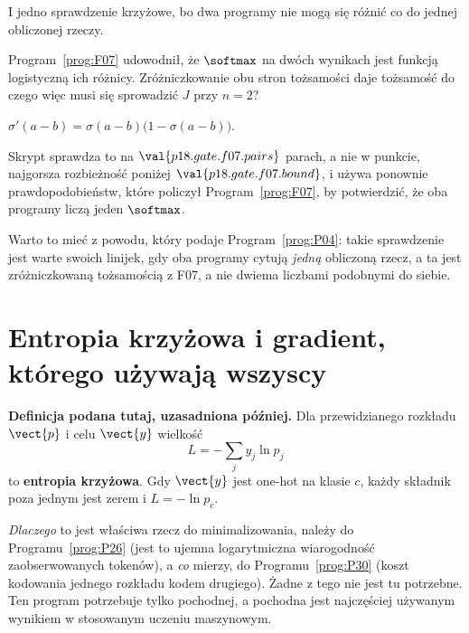 \begin{fr}
I jedno sprawdzenie krzyżowe, bo dwa programy nie mogą się różnić co do
jednej obliczonej rzeczy.

Program~\ref{prog:F07} udowodnił, że $\softmax$ na dwóch wynikach jest
funkcją logistyczną ich różnicy. Zróżniczkowanie obu stron tożsamości daje
tożsamość \dash{} do czego więc musi się sprowadzić $J$ przy $n = 2$?
\nextframe
\end{fr}

\begin{fr}
\begin{ansblock}
$\sigma'(a - b) = \sigma(a-b)\bigl(1 - \sigma(a-b)\bigr)$.
\end{ansblock}

Skrypt sprawdza to na $\val{p18.gate.f07.pairs}$ parach, a nie w punkcie,
najgorsza rozbieżność poniżej $\val{p18.gate.f07.bound}$, i używa ponownie
prawdopodobieństw, które policzył Program~\ref{prog:F07}, by potwierdzić, że
oba programy liczą jeden $\softmax$.

Warto to mieć z powodu, który podaje Program~\ref{prog:P04}: takie
sprawdzenie jest warte swoich linijek, gdy oba programy cytują \emph{jedną}
obliczoną rzecz, a ta jest zróżniczkowaną tożsamością z F07, a nie dwiema
liczbami podobnymi do siebie.
\end{fr}

\section{Entropia krzyżowa i gradient, którego używają wszyscy}
\label{sec:P18-cross-entropy}

\begin{fr}
\begin{note}
\textbf{Definicja podana tutaj, uzasadniona później.} Dla przewidzianego
rozkładu $\vect{p}$ i celu $\vect{y}$ wielkość
\[ L = -\sum_j y_j \ln p_j \]
to \textbf{entropia krzyżowa}. Gdy $\vect{y}$ jest one-hot na klasie $c$,
każdy składnik poza jednym jest zerem i $L = -\ln p_c$.

\emph{Dlaczego} to jest właściwa rzecz do minimalizowania, należy do
Programu~\ref{prog:P26} (jest to ujemna logarytmiczna wiarogodność
zaobserwowanych tokenów), a \emph{co} mierzy, do Programu~\ref{prog:P30}
(koszt kodowania jednego rozkładu kodem drugiego). Żadne z tego nie jest tu
potrzebne. Ten program potrzebuje tylko pochodnej, a pochodna jest
najczęściej używanym wynikiem w stosowanym uczeniu maszynowym.
\end{note}
\end{fr}

